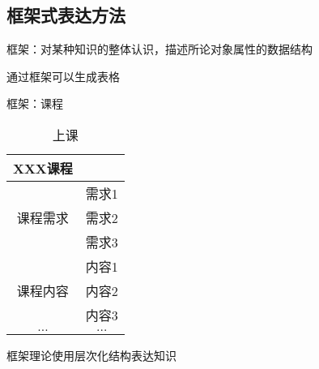 % 
\subsection{框架式表达方法}%
\label{sub:框架式表达方法}
\begin{defi}
    框架：对某种知识的整体认识，描述所论对象属性的数据结构
\end{defi}
通过框架可以生成表格
\begin{eg}
    框架：课程

    \begin{table}[htpb]
        \centering
        \caption{上课}
        \label{tab:上课}
        \begin{tabular}{|c|c|}
        \hline
        XXX课程 & \\
        \hline
        \multirow{3}{*}{课程需求} & 需求1 \\
                                  & 需求2 \\
                                  & 需求3 \\
                                  \hline
        \multirow{3}{*}{课程内容} & 内容1 \\
                                  & 内容2 \\
                                  & 内容3 \\
                                  \hline
        $\ldots$ & $\ldots$ \\
        \hline
        \end{tabular}
    \end{table}
\end{eg}
框架理论使用层次化结构表达知识
\newpage
